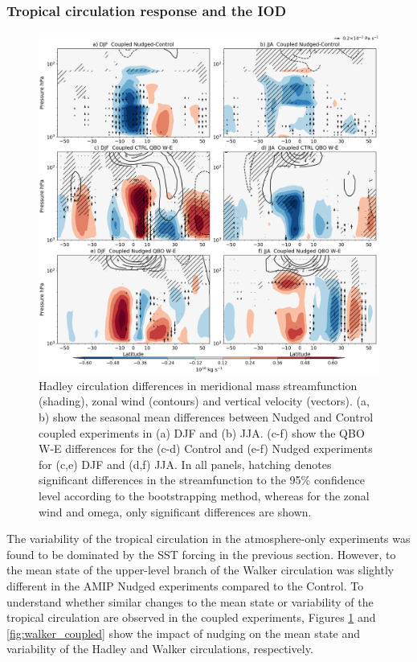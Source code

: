 \subsubsection{Tropical circulation response and the IOD}

\begin{figure}[t!]
\centering
 \includegraphics[width=\linewidth]{figures/suite_coupledhadley.png}
\caption[Hadley circulation in coupled nudged experiments.]{Hadley circulation differences in meridional mass streamfunction (shading), zonal wind (contours) and vertical velocity (vectors). (a, b) show the seasonal mean differences between Nudged and Control coupled experiments in (a) DJF and (b) JJA. (c-f) show the QBO W-E differences for the (c-d) Control and (e-f) Nudged experiments for (c,e) DJF and (d,f) JJA. In all panels, hatching denotes significant differences in the streamfunction to the 95\% confidence level according to the bootstrapping method, whereas for the zonal wind and omega, only significant differences are shown.}
\label{fig:hadley_coupled}
\end{figure}

The variability of the tropical circulation in the atmosphere-only experiments was found to be dominated by the SST forcing in the previous section. However, to the mean state of the upper-level branch of the Walker circulation was slightly different in the AMIP Nudged experiments compared to the Control. 
To understand whether similar changes to the mean state or variability of the tropical circulation are observed in the coupled experiments, Figures \ref{fig:hadley_coupled} and \ref{fig:walker_coupled} show the impact of nudging on the mean state and variability of the Hadley and Walker circulations, respectively.

